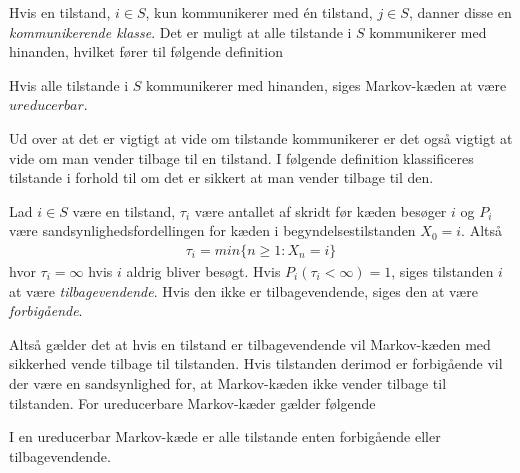 Hvis en tilstand, $i \in S$, kun kommunikerer med én tilstand, $j \in S$, danner disse en \textit{kommunikerende klasse}. Det er muligt at alle tilstande i $S$ kommunikerer med hinanden, hvilket fører til følgende definition
 
\begin{minipage}\textwidth
\begin{defn}\textbf{} %
\newline
Hvis alle tilstande i $S$ kommunikerer med hinanden, siges Markov-kæden at være $ureducerbar$.
\end{defn}
\end{minipage}

Ud over at det er vigtigt at vide om tilstande kommunikerer er det også vigtigt at vide om man vender tilbage til en tilstand. I følgende definition klassificeres tilstande i forhold til om det er sikkert at man vender tilbage til den. 

\begin{minipage}\textwidth
\begin{defn}\textbf{} %
\newline
Lad $i\in S$ være en tilstand, $\tau_i$ være antallet af skridt før kæden besøger $i$ og $P_i$ være sandsynlighedsfordellingen for kæden i begyndelsestilstanden $X_0=i$. Altså
\begin{align*}
    \tau_i=min\{n\geq1:X_n=i\}
\end{align*}
hvor $\tau_i=\infty$ hvis $i$ aldrig bliver besøgt. Hvis $P_i(\tau_i<\infty)=1$, siges tilstanden $i$ at være \textit{tilbagevendende}. Hvis den ikke er tilbagevendende, siges den at være  \textit{forbigående}.
\end{defn}
\end{minipage}

Altså gælder det at hvis en tilstand er tilbagevendende vil Markov-kæden med sikkerhed vende tilbage til tilstanden. Hvis tilstanden derimod er forbigående vil der være en sandsynlighed for, at Markov-kæden ikke vender tilbage til tilstanden. For ureducerbare Markov-kæder gælder følgende

\begin{minipage}\textwidth
\begin{kor} \textbf{} \label{kor:enten_forbigå_eller_tilbagevend}%
\newline
I en ureducerbar Markov-kæde er alle tilstande enten forbigående eller tilbagevendende.
\end{kor}
\end{minipage}

